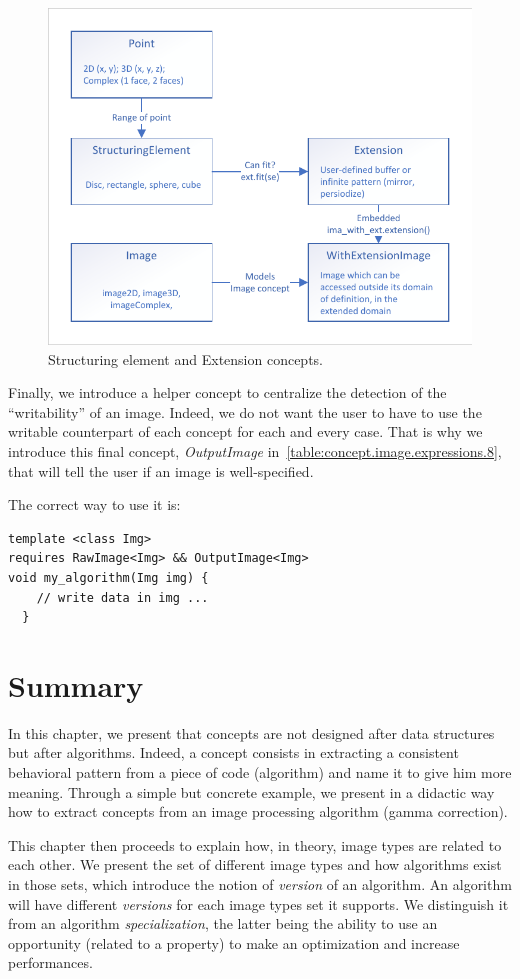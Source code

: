 \begin{figure}[htbp]
  \centering
  \includegraphics[width=.8\linewidth]{../figures/concepts/se_extension}
  \caption{Structuring element and Extension concepts.}
  \label{fig:concept.se_extension}
\end{figure}

Finally, we introduce a helper concept to centralize the detection of the ``writability'' of an image. Indeed, we do not
want the user to have to use the writable counterpart of each concept for each and every case. That is why we introduce
this final concept, \emph{OutputImage} in~\cref{table:concept.image.expressions.8}, that will tell the user if an image
is well-specified.

The correct way to use it is:
\begin{verbatim}
template <class Img>
requires RawImage<Img> && OutputImage<Img>
void my_algorithm(Img img) {
    // write data in img ...
  }
\end{verbatim}

\section{Summary}

In this chapter, we present that concepts are not designed after data structures but after algorithms. Indeed, a concept
consists in extracting a consistent behavioral pattern from a piece of code (algorithm) and name it to give him more
meaning. Through a simple but concrete example, we present in a didactic way how to extract concepts from an image
processing algorithm (gamma correction).

This chapter then proceeds to explain how, in theory, image types are related to each other. We present the set of
different image types and how algorithms exist in those sets, which introduce the notion of \emph{version} of an
algorithm. An algorithm will have different \emph{versions} for each image types set it supports. We distinguish it from
an algorithm \emph{specialization}, the latter being the ability to use an opportunity (related to a property) to make
an optimization and increase performances.

